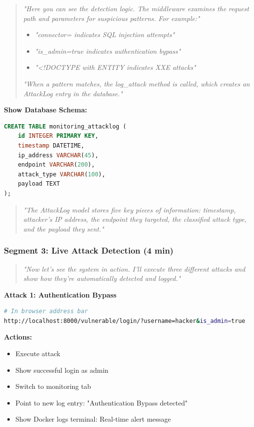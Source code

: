 \documentclass[12pt,a4paper]{article}
\begin{document}
\begin{quote}
\textit{"Here you can see the detection logic. The middleware examines the request path and parameters for suspicious patterns. For example:"}
\begin{itemize}
    \item \textit{"connector= indicates SQL injection attempts"}
    \item \textit{"is\_admin=true indicates authentication bypass"}
    \item \textit{"<!DOCTYPE with ENTITY indicates XXE attacks"}
\end{itemize}

\textit{"When a pattern matches, the log\_attack method is called, which creates an AttackLog entry in the database."}
\end{quote}

\textbf{Show Database Schema:}
\begin{lstlisting}[language=SQL]
CREATE TABLE monitoring_attacklog (
    id INTEGER PRIMARY KEY,
    timestamp DATETIME,
    ip_address VARCHAR(45),
    endpoint VARCHAR(200),
    attack_type VARCHAR(100),
    payload TEXT
);
\end{lstlisting}

\begin{quote}
\textit{"The AttackLog model stores five key pieces of information: timestamp, attacker's IP address, the endpoint they targeted, the classified attack type, and the payload they sent."}
\end{quote}

\subsubsection{Segment 3: Live Attack Detection (4 min)}

\begin{quote}
\textit{"Now let's see the system in action. I'll execute three different attacks and show how they're automatically detected and logged."}
\end{quote}

\textbf{Attack 1: Authentication Bypass}
\begin{lstlisting}[language=bash]
# In browser address bar
http://localhost:8000/vulnerable/login/?username=hacker&is_admin=true
\end{lstlisting}

\textbf{Actions:}
\begin{itemize}
    \item Execute attack
    \item Show successful login as admin
    \item Switch to monitoring tab
    \item Point to new log entry: "Authentication Bypass detected"
    \item Show Docker logs terminal: Real-time alert message
\end{itemize}
\end{document}
